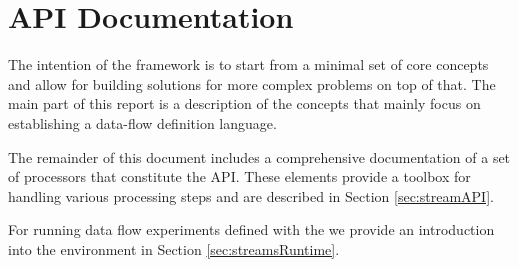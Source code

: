 \clearpage
\part{API Documentation}

The intention of the \streams framework is to start from a minimal set
of core concepts and allow for building solutions for more complex
problems on top of that. The main part of this report is a description
of the concepts that mainly focus on establishing a data-flow
definition language.

The remainder of this document includes a comprehensive documentation
of a set of processors that constitute the \streams API. These
elements provide a toolbox for handling various processing steps and
are described in Section \ref{sec:streamAPI}.

\bigskip

For running data flow experiments defined with the \streams we provide
an introduction into the  environment in Section
\ref{sec:streamsRuntime}.


\begin{appendix}

%

\end{appendix}
